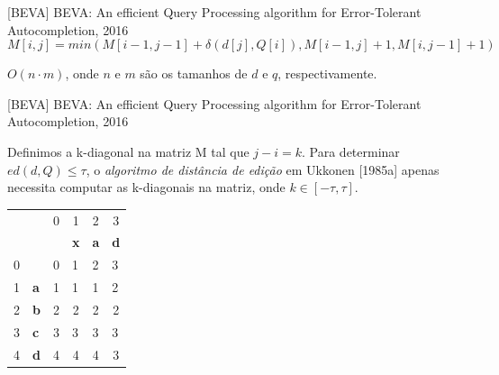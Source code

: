 \documentclass[11pt]{beamer}
\begin{document}
\begin{frame}{[BEVA] BEVA: An efficient Query Processing algorithm for Error-Tolerant Autocompletion, 2016}
    \[ M[i, j] = min(M[i - 1, j - 1] + \delta(d[j], Q[i]), M[i - 1, j] + 1, M[i, j - 1] + 1) \]
    
    $O(n \cdot m)$, onde $n$ e $m$ são os tamanhos de $d$ e $q$, respectivamente.
    
\end{frame}

\begin{frame}{[BEVA] BEVA: An efficient Query Processing algorithm for Error-Tolerant Autocompletion, 2016}

    Definimos a k-diagonal na matriz M tal que $j - i = k$. Para determinar $ed(d, Q) \le \tau$, o \textit{algoritmo de distância de edição} em Ukkonen [1985a] apenas necessita computar as k-diagonais na matriz, onde $k \in [-\tau, \tau]$.
  
    \begin{table}[]
    \begin{tabular}{llllll}
     &  & \multicolumn{1}{c}{{\color[HTML]{656565} 0}} & \multicolumn{1}{c}{{\color[HTML]{656565} 1}} & \multicolumn{1}{c}{{\color[HTML]{656565} 2}} & \multicolumn{1}{c}{{\color[HTML]{656565} 3}} \\
     &  &  & \textbf{x} & \textbf{a} & \textbf{d} \\ \cline{3-6} 
    {\color[HTML]{656565} 0} & \multicolumn{1}{l|}{} & \multicolumn{1}{l|}{{\color[HTML]{000000} 0}} & \multicolumn{1}{l|}{{\color[HTML]{000000} 1}} & \multicolumn{1}{l|}{{\color[HTML]{000000} 2}} & \multicolumn{1}{l|}{{\color[HTML]{000000} 3}} \\ \cline{3-6} 
    {\color[HTML]{656565} 1} & \multicolumn{1}{l|}{\textbf{a}} & \multicolumn{1}{l|}{{\color[HTML]{000000} 1}} & \multicolumn{1}{l|}{{\color[HTML]{000000} 1}} & \multicolumn{1}{l|}{{\color[HTML]{000000} 1}} & \multicolumn{1}{l|}{{\color[HTML]{000000} 2}} \\ \cline{3-6} 
    {\color[HTML]{656565} 2} & \multicolumn{1}{l|}{\textbf{b}} & \multicolumn{1}{c|}{{\color[HTML]{000000} 2}} & \multicolumn{1}{c|}{{\color[HTML]{000000} 2}} & \multicolumn{1}{c|}{{\color[HTML]{000000} 2}} & \multicolumn{1}{c|}{{\color[HTML]{000000} 2}} \\ \cline{3-6} 
    {\color[HTML]{656565} 3} & \multicolumn{1}{l|}{\textbf{c}} & \multicolumn{1}{l|}{{\color[HTML]{000000} 3}} & \multicolumn{1}{l|}{{\color[HTML]{000000} 3}} & \multicolumn{1}{l|}{{\color[HTML]{000000} 3}} & \multicolumn{1}{l|}{{\color[HTML]{000000} 3}} \\ \cline{3-6} 
    {\color[HTML]{656565} 4} & \multicolumn{1}{l|}{\textbf{d}} & \multicolumn{1}{c|}{{\color[HTML]{000000} 4}} & \multicolumn{1}{c|}{{\color[HTML]{000000} 4}} & \multicolumn{1}{c|}{{\color[HTML]{000000} 4}} & \multicolumn{1}{c|}{{\color[HTML]{000000} 3}} \\ \cline{3-6} 
    \end{tabular}
    \end{table}
    
\end{frame}
\end{document}
